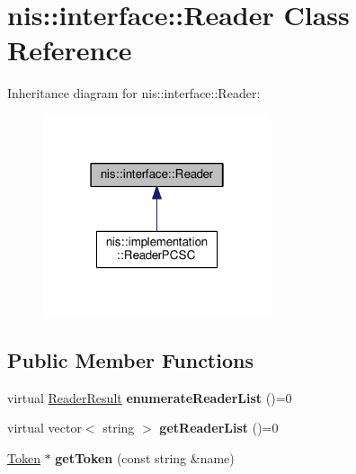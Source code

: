 \hypertarget{classnis_1_1interface_1_1Reader}{\section{nis\-:\-:interface\-:\-:Reader Class Reference}
\label{classnis_1_1interface_1_1Reader}
}


Inheritance diagram for nis\-:\-:interface\-:\-:Reader\-:
\nopagebreak
\begin{figure}[H]
\begin{center}
\leavevmode
\includegraphics[width=190pt]{classnis_1_1interface_1_1Reader__inherit__graph}
\end{center}
\end{figure}
\subsection*{Public Member Functions}
\begin{DoxyCompactItemize}
\item 
\hypertarget{classnis_1_1interface_1_1Reader_abf689da8251ccbf468c495ce9b6eb2e7}{virtual \hyperlink{nis__types_8h_a484156f5b8cf43396c5bbe77226fa8da}{Reader\-Result} {\bfseries enumerate\-Reader\-List} ()=0}\label{classnis_1_1interface_1_1Reader_abf689da8251ccbf468c495ce9b6eb2e7}

\item 
\hypertarget{classnis_1_1interface_1_1Reader_a65d1522165b9660c1c1be260af28cbd0}{virtual vector$<$ string $>$ {\bfseries get\-Reader\-List} ()=0}\label{classnis_1_1interface_1_1Reader_a65d1522165b9660c1c1be260af28cbd0}

\item 
\hypertarget{classnis_1_1interface_1_1Reader_a38a4cbeb0699bbbd88198905a2274c5a}{\hyperlink{classnis_1_1interface_1_1Token}{Token} $\ast$ {\bfseries get\-Token} (const string \&name)}\label{classnis_1_1interface_1_1Reader_a38a4cbeb0699bbbd88198905a2274c5a}

\end{DoxyCompactItemize}
